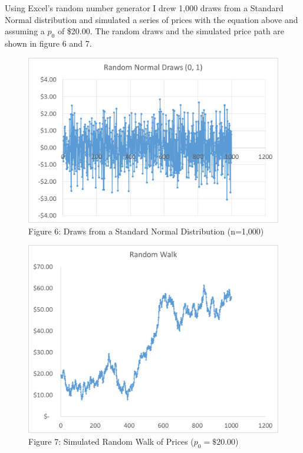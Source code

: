 \documentclass[
  letterpaper,
  DIV=11,
  numbers=noendperiod]{scrreprt}
\begin{document}
Using Excel's random number generator I drew 1,000 draws from a Standard
Normal distribution and simulated a series of prices with the equation
above and assuming a \(p_0\) of \$20.00. The random draws and the
simulated price path are shown in figure 6 and 7.

\begin{figure}

{\centering \includegraphics{Excel-files/IntroductiontoCommodityTS-random_walk_files/image003.png}

}

\caption{Figure 6: Draws from a Standard Normal Distribution (n=1,000)}

\end{figure}

\begin{figure}

{\centering \includegraphics{Excel-files/IntroductiontoCommodityTS-random_walk_files/image001.png}

}

\caption{Figure 7: Simulated Random Walk of Prices (\(p_0 = \$20.00\))}

\end{figure}
\end{document}
